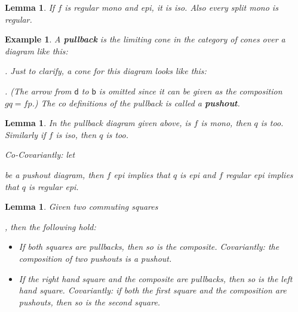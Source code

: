 \documentclass{article}
\newcommand{\ob}[1]{\mathsf{#1}} %
\newtheorem{lemma}[theorem]{Lemma}
\newtheorem{example}[theorem]{Example}
\begin{document}
\begin{lemma}
	If $f$ is regular mono and epi, it is iso. Also every split mono is regular.
\end{lemma}

\begin{example}
	A \textbf{pullback} is the limiting cone in the category of cones over a diagram like this:
	.
	Just to clarify, a cone for this diagram looks like this:
	.
	(The arrow from $\ob{d}$ to $\ob{b}$ is omitted since it can be given as the composition $gq = fp$.) The co definitions of the pullback is called a \textbf{pushout}.
\end{example}

\begin{lemma}
	In the pullback diagram given above, is $f$ is mono, then $q$ is too. Similarly if $f$ is iso, then $q$ is too.

	Co-Covariantly: let
	 be a pushout diagram, then $f$ epi implies that $q$ is epi and $f$ regular epi implies that $q$ is regular epi.
\end{lemma}

\begin{lemma}
	Given two commuting squares
	, then the following hold:
	\begin{itemize}
		\item If both squares are pullbacks, then so is the composite. Covariantly: the composition of two pushouts is a pushout.
		\item If the right hand square and the composite are pullbacks, then so is the left hand square.
		Covariantly: if both the first square and the composition are pushouts, then so is the second square.
	\end{itemize}
\end{lemma}
\end{document}
